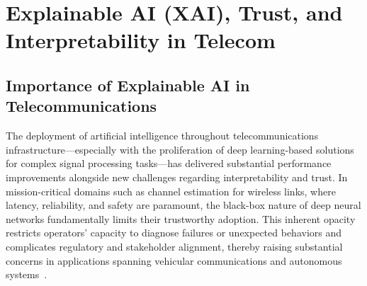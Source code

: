 \documentclass[sigconf]{acmart}
\begin{document}
\section{Explainable AI (XAI), Trust, and Interpretability in Telecom}

\subsection{Importance of Explainable AI in Telecommunications}

The deployment of artificial intelligence throughout telecommunications infrastructure—especially with the proliferation of deep learning-based solutions for complex signal processing tasks—has delivered substantial performance improvements alongside new challenges regarding interpretability and trust. In mission-critical domains such as channel estimation for wireless links, where latency, reliability, and safety are paramount, the black-box nature of deep neural networks fundamentally limits their trustworthy adoption. This inherent opacity restricts operators' capacity to diagnose failures or unexpected behaviors and complicates regulatory and stakeholder alignment, thereby raising substantial concerns in applications spanning vehicular communications and autonomous systems~\cite{ref38}\cite{ref41}.
\end{document}
